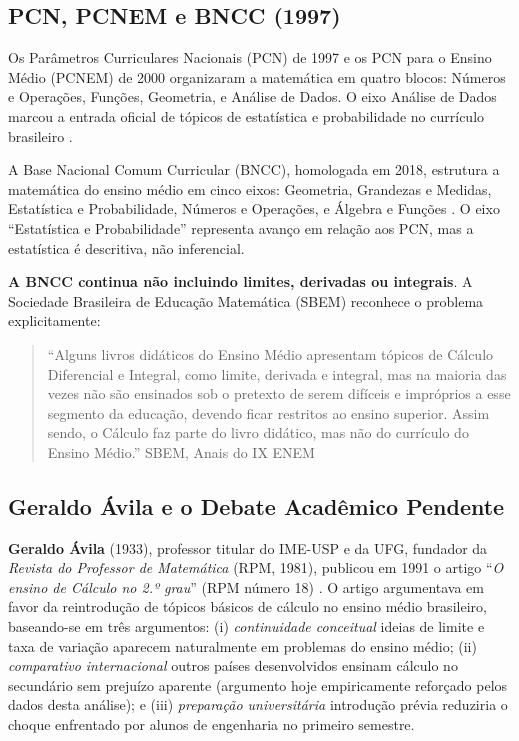 \documentclass[12pt,a4paper,oneside]{article}
\begin{document}
\subsection{PCN, PCNEM e BNCC (1997)}

Os Parâmetros Curriculares Nacionais (PCN) de 1997 e os PCN para o
Ensino Médio (PCNEM) de 2000 organizaram a matemática em quatro
blocos: Números e Operações, Funções, Geometria, e Análise de
Dados. O eixo Análise de Dados marcou a entrada oficial de tópicos
de estatística e probabilidade no currículo brasileiro
\cite{ref:ufop-prob-bncc}.

A Base Nacional Comum Curricular (BNCC), homologada em 2018,
estrutura a matemática do ensino médio em cinco eixos: Geometria,
Grandezas e Medidas, Estatística e Probabilidade, Números e
Operações, e Álgebra e Funções \cite{ref:bncc-2018}. O eixo
``Estatística e Probabilidade'' representa avanço em relação aos
PCN, mas a estatística é descritiva, não inferencial.

\textbf{A BNCC continua não incluindo limites, derivadas ou
integrais}. A Sociedade Brasileira de Educação Matemática (SBEM)
reconhece o problema explicitamente:

\begin{quote}
\small
``Alguns livros didáticos do Ensino Médio apresentam tópicos de
Cálculo Diferencial e Integral, como limite, derivada e integral,
mas na maioria das vezes não são ensinados sob o pretexto de serem
difíceis e impróprios a esse segmento da educação, devendo ficar
restritos ao ensino superior. Assim sendo, o Cálculo faz parte do
livro didático, mas não do currículo do Ensino Médio.''
\hfill\textemdash{} SBEM, Anais do IX ENEM \cite{ref:sbem-calculo}
\end{quote}

\subsection{Geraldo Ávila e o Debate Acadêmico Pendente}

\textbf{Geraldo Ávila} (1933), professor titular do
IME-USP e da UFG, fundador da \emph{Revista do Professor de
Matemática} (RPM, 1981), publicou em 1991 o artigo ``\emph{O ensino
de Cálculo no 2.º grau}'' (RPM número 18) \cite{ref:avila-rpm18}.
O artigo argumentava em favor da reintrodução de tópicos básicos
de cálculo no ensino médio brasileiro, baseando-se em três
argumentos: (i) \emph{continuidade conceitual} \textemdash{} ideias
de limite e taxa de variação aparecem naturalmente em problemas do
ensino médio; (ii) \emph{comparativo internacional} \textemdash{}
outros países desenvolvidos ensinam cálculo no secundário sem
prejuízo aparente (argumento hoje empiricamente reforçado pelos
dados desta análise); e (iii) \emph{preparação universitária}
\textemdash{} introdução prévia reduziria o choque enfrentado por
alunos de engenharia no primeiro semestre.
\end{document}
